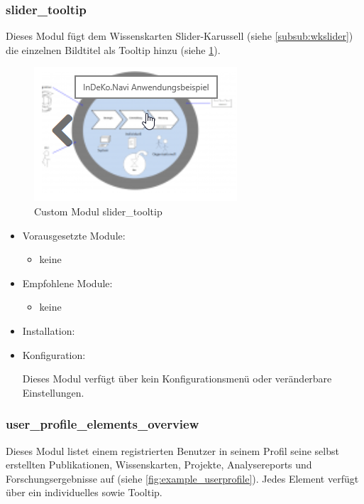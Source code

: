 \newpage
\subsubsection{slider\_tooltip}\label{subsub:slidertooltip}
Dieses Modul fügt dem Wissenskarten Slider-Karussell (siehe \cref{subsub:wkslider}) die einzelnen Bildtitel als Tooltip hinzu (siehe \cref{fig:example_slidertooltip}). 

\begin{figure}[H]
	\centering
	\includegraphics[height=0.10\textheight]{images/example_slidertooltip}
	\caption{Custom Modul slider\_tooltip}
	\label{fig:example_slidertooltip}
\end{figure}

\begin{itemize}[parsep=0pt, itemsep=5.0pt plus 2.0pt minus 1.0pt, leftmargin=*]
	\item Vorausgesetzte Module:
	\begin{itemize}
		\item keine
	\end{itemize}
	
	\item Empfohlene Module:
	\begin{itemize}
		\item keine
	\end{itemize}
	
	\item Installation: \standardinstall
	
	
	\item Konfiguration:
	
	Dieses Modul verfügt über kein Konfigurationsmenü oder veränderbare Einstellungen.	
\end{itemize}


\newpage
\subsubsection{user\_profile\_elements\_overview}\label{subsub:userprofileelementsoverview}
Dieses Modul listet einem registrierten Benutzer in seinem Profil seine selbst erstellten Publikationen, Wissenskarten, Projekte, Analysereports und Forschungsergebnisse auf (siehe \cref{fig:example_userprofile}). Jedes Element verfügt über ein individuelles sowie Tooltip.


